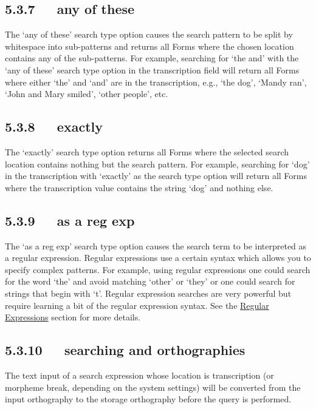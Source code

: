 \documentclass[letterpaper,10pt,english]{sphinxmanual}
\begin{document}
\subsection{5.3.7   any of these}
\label{documentation:any-of-these}
The `any of these' search type option causes the search pattern to be split by
whitespace into sub-patterns and returns all Forms where the chosen location
contains any of the sub-patterns.  For example, searching for `the and' with the
`any of these' search type option in the transcription field will return all
Forms where either `the' and `and' are in the transcription, e.g., `the dog',
`Mandy ran', `John and Mary smiled', `other people', etc.


\subsection{5.3.8   exactly}
\label{documentation:exactly}
The `exactly' search type option returns all Forms where the selected search
location contains nothing but the search pattern.  For example, searching for
`dog' in the transcription with `exactly' as the search type option will return
all Forms where the transcription value contains the string `dog' and nothing
else.


\subsection{5.3.9   as a reg exp}
\label{documentation:as-a-reg-exp}
The `as a reg exp' search type option causes the search term to be interpreted
as a regular expression.  Regular expressions use a certain syntax which allows
you to specify complex patterns.  For example, using regular expressions one
could search for the word `the' and avoid matching `other' or `they' or one
could search for strings that begin with `t'.  Regular expression searches are
very powerful but require learning a bit of the regular expression syntax.  See
the {\hyperref[documentation:regular-expressions]{Regular Expressions}} section for more details.


\subsection{5.3.10   searching and orthographies}
\label{documentation:searching-and-orthographies}
The text input of a search expression whose location is transcription (or
morpheme break, depending on the system settings) will be converted from the
input orthography to the storage orthography before the query is performed.
\end{document}
